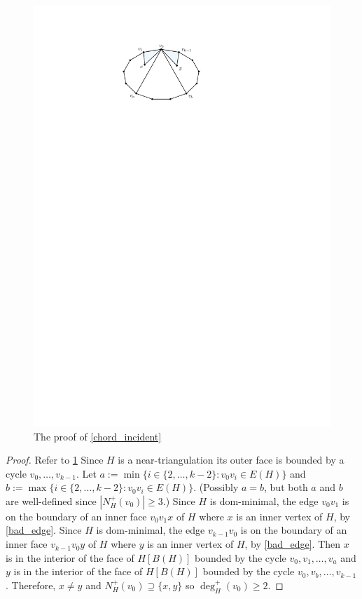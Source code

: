 \documentclass{article}
\theoremstyle{definition}
\begin{document}
\begin{figure}[htbp]
  \centering
  \includegraphics{figs/chord_incident}
  \caption{The proof of \cref{chord_incident}}
  \label{chord_incident_fig}
\end{figure}
\begin{proof}
  Refer to \cref{chord_incident_fig}
  Since $H$ is a near-triangulation its outer face is bounded by a cycle $v_0,\ldots,v_{k-1}$.  Let $a:=\min\{i\in\{2,\ldots,k-2\}:v_0v_i\in E(H)\}$ and $b:=\max\{i\in\{2,\ldots,k-2\}:v_0v_i\in E(H)\}$. (Possibly $a=b$, but both $a$ and $b$ are well-defined since $|N^+_H(v_0)|\ge 3$.)   Since $H$ is dom-minimal, the edge $v_0v_1$ is on the boundary of an inner face $v_0v_1x$ of $H$ where $x$ is an inner vertex of $H$, by \cref{bad_edge}.  Since $H$ is dom-minimal, the edge $v_{k-1}v_0$ is on the boundary of an inner face $v_{k-1}v_0y$ of $H$ where $y$ is an inner vertex of $H$, by \cref{bad_edge}.  Then $x$ is in the interior of the face of $H[B(H)]$ bounded by the cycle $v_0,v_1,\ldots,v_a$ and $y$ is in the interior of the face of $H[B(H)]$ bounded by the cycle $v_0,v_b,\ldots,v_{k-1}$.  Therefore, $x\neq y$ and $N^+_H(v_0)\supseteq\{x,y\}$ so $\deg^+_H(v_0)\ge 2$.
\end{proof}
\end{document}
